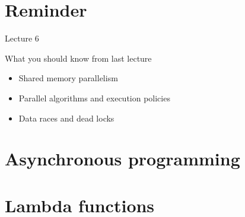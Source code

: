 \documentclass[12pt,t]{beamer}
\title{\coursename}
\subtitle{Lecture 7: Asynchronous programming }
\date {
 \tiny \url{\courseurl}
\vspace{2cm}
\doclicenseThis  
  
}
\begin{document}
 {
    \frame {
        \titlepage
    }
}

\frame{

\tableofcontents

}


\section{Reminder}
\begin{frame}{Lecture 6}
\begin{block}{What you should know from last lecture}
\begin{itemize}
\item Shared memory parallelism
\item Parallel algorithms and execution policies
\item Data races and dead locks
\end{itemize}
\end{block}
\end{frame}


\section{Asynchronous programming}


\section{Lambda functions}
\end{document}

